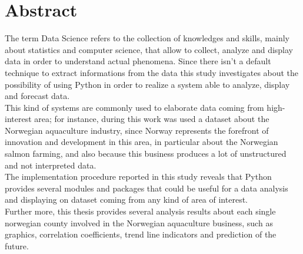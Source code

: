 \clearpage 

\chapter{Abstract}

The term Data Science refers to the collection of knowledges and skills, mainly about statistics and computer science, that allow to collect, analyze and display data in order to understand actual phenomena. Since there isn't a default technique to extract informations from the data this study investigates about the possibility of using Python in order to realize a system able to analyze, display and forecast data. \\
This kind of systems are commonly used to elaborate data coming from high-interest area; for instance, during this work was used a dataset about the Norwegian aquaculture industry, since Norway represents the forefront of innovation and development in this area, in particular about the Norwegian salmon farming, and also because this business produces a lot of unstructured and not interpreted data. \\
The implementation procedure reported in this study reveals that Python provides several modules and packages that could be useful for a data analysis and displaying on dataset coming from any kind of area of interest. \\
Further more, this thesis provides several analysis results about each single norwegian county involved in the Norwegian aquaculture business, such as graphics, correlation coefficients, trend line indicators and prediction of the future.



